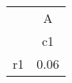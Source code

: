 \begin{tabular}{l*{1}{c}}
\hline\hline
            &           A\\
            &          c1\\
\hline
r1          &        0.06\\
\hline\hline
\end{tabular}
